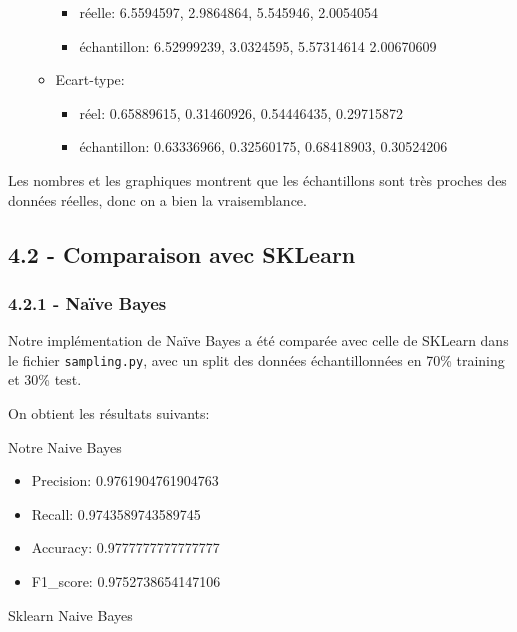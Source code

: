 \documentclass[
]{article}
\providecommand{\tightlist}{%
  \setlength{\itemsep}{0pt}\setlength{\parskip}{0pt}}
\begin{document}
\begin{itemize}
\begin{itemize}
    \begin{itemize}
    \tightlist
    \item
      réelle: 6.5594597, 2.9864864, 5.545946, 2.0054054
    \item
      échantillon: 6.52999239, 3.0324595, 5.57314614 2.00670609
    \end{itemize}
  \item
    Ecart-type:

    \begin{itemize}
    \tightlist
    \item
      réel: 0.65889615, 0.31460926, 0.54446435, 0.29715872
    \item
      échantillon: 0.63336966, 0.32560175, 0.68418903, 0.30524206
    \end{itemize}
  \end{itemize}
\end{itemize}

Les nombres et les graphiques montrent que les échantillons sont très
proches des données réelles, donc on a bien la vraisemblance.

\hypertarget{comparaison-avec-sklearn}{%
\subsection{4.2 - Comparaison avec
SKLearn}\label{comparaison-avec-sklearn}}

\hypertarget{nauxefve-bayes}{%
\subsubsection{4.2.1 - Naïve Bayes}\label{nauxefve-bayes}}

Notre implémentation de Naïve Bayes a été comparée avec celle de SKLearn
dans le fichier \texttt{sampling.py}, avec un split des données
échantillonnées en 70\% training et 30\% test.

On obtient les résultats suivants:

Notre Naive Bayes

\begin{itemize}
\item
  Precision: 0.9761904761904763
\item
  Recall: 0.9743589743589745
\item
  Accuracy: 0.9777777777777777
\item
  F1\_score: 0.9752738654147106
\end{itemize}

Sklearn Naive Bayes
\end{document}
